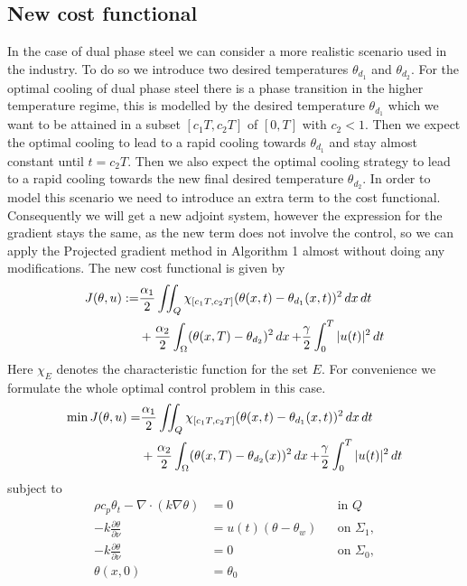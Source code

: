 \subsection{New cost functional}\label{sec:new-cost-func}

In the case of dual phase steel we can consider a more realistic scenario used in the industry. To do so we introduce two desired temperatures $\theta_{d_1}$ and $\theta_{d_2}$. For the optimal cooling of dual phase steel there is a phase transition in the higher temperature regime, this is modelled by the desired temperature $\theta_{d_1}$ which we want to be attained in a subset $[c_1T, c_2T]$ of $[0,T]$ with $c_2 <1$. Then we expect the optimal cooling to lead to a rapid cooling towards $\theta_{d_1}$ and stay almost constant until $t=c_2T$. Then we also expect the optimal cooling strategy to lead to a rapid cooling towards the new final desired temperature $\theta_{d_2}$. In order to model this scenario we need to introduce an extra term to the cost functional. Consequently we will get a new adjoint system, however the expression for the gradient stays the same, as the new term does not involve the control, so we can apply the Projected gradient method in Algorithm 1 almost without doing any modifications. The new cost functional is given by 
\begin{equation}
\begin{aligned}
    \label{eq:new_cost}
    J(\theta,u) : =& \frac{\alpha_1}{2}\iint_{Q}\chi_{[c_1T,c_2T]}(\theta(x,t) - \theta_{d_1}(x,t))^2 \mathop{dx}\mathop{dt} \\
    &+ \frac{\alpha_2}{2}\int_{\Omega} (\theta(x,T) - \theta_{d_2})^2 \mathop{dx} + \frac{\gamma}{2}\int_0^T|u(t)|^2\mathop{dt}
\end{aligned}
\end{equation}
Here $\chi_E$ denotes the characteristic function for the set $E$. For convenience we formulate the whole optimal control problem in this case. 
\begin{equation*}
\begin{aligned}
   \min J(\theta, u) =& \frac{\alpha_1}{2}\iint_{Q}\chi_{[c_1T,c_2T]}(\theta(x,t) - \theta_{d_1}(x,t))^2 \mathop{dx}\mathop{dt} \\
   &+ \frac{\alpha_2}{2} \int_\Omega (\theta(x, T) - \theta_{d_2}(x))^2 \mathop{dx} + \frac{\gamma}{2} \int_0^{T} |u(t)|^2 \mathop{dt} 
\end{aligned}
\end{equation*}
subject to
\begin{align*}
       \rho c_p \theta_t - \nabla \cdot (k \nabla \theta) &= 0  &&\text{in } Q  \\
      -k \frac{\partial \theta}{\partial \nu} &= u(t) (\theta - \theta_w)  &&\text{on } \Sigma_1, \\
      -k \frac{\partial \theta}{\partial \nu} &= 0  &&\text{on } \Sigma_0, \\
      \theta(x, 0) &= \theta_0 
\end{align*}

